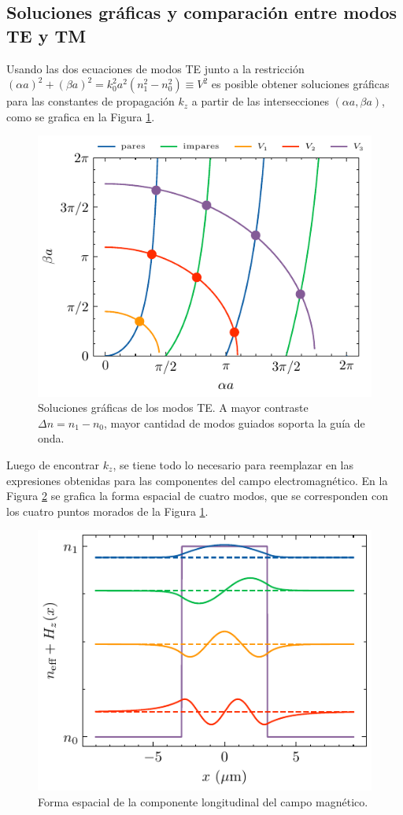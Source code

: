 \subsection{Soluciones gráficas y comparación entre modos TE y TM \label{cap:solslabTETM}}

Usando las dos ecuaciones de modos TE junto a la restricción $(\alpha a)^2 + (\beta a)^2 = k_0^2 a^2(n_1^2 - n_0^2) \equiv V^2$ es posible obtener soluciones gráficas para las constantes de propagación $k_z$ a partir de las intersecciones $(\alpha a, \beta a)$, como se grafica en la Figura \ref{fig:graphTE}. 

\begin{figure}[H]
	\centering
	\includegraphics[width=0.5\linewidth]{media/slabgraphical.pdf}
	\caption[Soluciones gráficas de los modos TE.]{Soluciones gráficas de los modos TE. A mayor contraste $\Delta n = n_1-n_0$, mayor cantidad de modos guiados soporta la guía de onda. \label{fig:graphTE}}
\end{figure}
Luego de encontrar $k_z$, se tiene todo lo necesario para reemplazar en las expresiones obtenidas para las componentes del campo electromagnético. En la Figura \ref{fig:E-slab-graph} se grafica la forma espacial de cuatro modos, que se corresponden con los cuatro puntos morados de la Figura \ref{fig:graphTE}.
\begin{figure}[H]
	\centering
	\includegraphics[width=0.5\linewidth]{media/TETMfields.pdf}
	\caption[Forma espacial de la componente longitudinal del campo magnético.]{ Forma espacial de la componente longitudinal del campo magnético. \label{fig:E-slab-graph}}
\end{figure}

